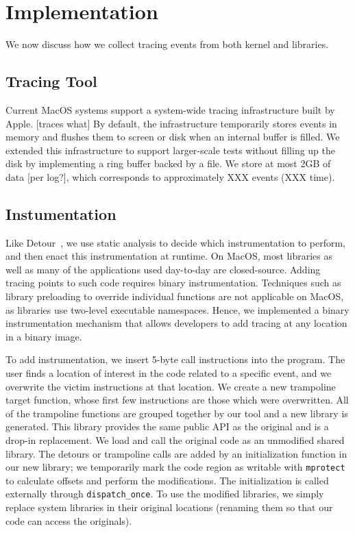 \section{Implementation}
We now discuss how we collect tracing events from both kernel and libraries.

\subsection{Tracing Tool}
Current MacOS systems support a system-wide tracing infrastructure built by Apple. [traces what]
By default, the infrastructure temporarily stores events in memory and flushes them to screen or disk when an internal buffer is filled.
We extended this infrastructure to support larger-scale tests without filling up the disk by implementing a ring buffer backed by a file.
We store at most 2GB of data [per log?], which corresponds to approximately XXX events (XXX time).

\subsection{Instumentation}
Like Detour~\cite{detourXXXXXXXX}, we use static analysis to decide which instrumentation to perform, and then enact this instrumentation at runtime. 
On MacOS, most libraries as well as many of the applications used day-to-day are closed-source.
Adding tracing points to such code requires binary instrumentation.
Techniques such as library preloading to override individual functions are not applicable on MacOS, as libraries use two-level executable namespaces.
Hence, we implemented a binary instrumentation mechanism that allows developers to add tracing at any location in a binary image.

To add instrumentation, we insert 5-byte call instructions into the program. The user finds a location of interest in the code related to a specific event,
and we overwrite the victim instructions at that location. We create a new trampoline target function, whose first few instructions are those which were overwritten.
All of the trampoline functions are grouped together by our tool and a new library is generated.
This library provides the same public API as the original and is a drop-in replacement. We load and call the original code as an unmodified shared library.
The detours or trampoline calls are added by an initialization function in our new library; we temporarily mark the code region as writable with \texttt{mprotect}
to calculate offsets and perform the modifications. The initialization is called externally through \texttt{dispatch\_once}.
To use the modified libraries, we simply replace system libraries in their original locations (renaming them so that our code can access the originals).

